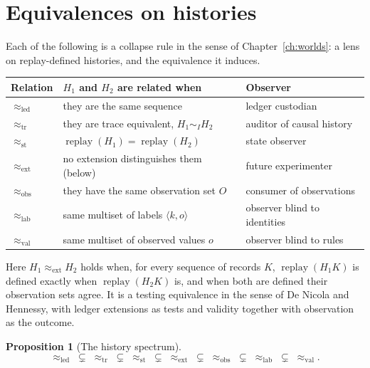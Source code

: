 \documentclass[11pt,openany]{book}
\newtheorem{proposition}[theorem]{Proposition}
\theoremstyle{remark}
\newcommand{\replay}{\operatorname{replay}}
\begin{document}
\section{Equivalences on histories}

Each of the following is a collapse rule in the sense of
Chapter~\ref{ch:worlds}: a lens on replay-defined histories, and the
equivalence it induces.
\begin{center}
\small
\begin{tabular}{lll}
\toprule
Relation & $H_1$ and $H_2$ are related when & Observer\\
\midrule
$\approx_{\mathrm{led}}$ & they are the same sequence & ledger custodian\\
$\approx_{\mathrm{tr}}$ & they are trace equivalent, $H_1\sim_I H_2$ & auditor of causal history\\
$\approx_{\mathrm{st}}$ & $\replay(H_1)=\replay(H_2)$ & state observer\\
$\approx_{\mathrm{ext}}$ & no extension distinguishes them (below) & future experimenter\\
$\approx_{\mathrm{obs}}$ & they have the same observation set $O$ & consumer of observations\\
$\approx_{\mathrm{lab}}$ & same multiset of labels $\langle k,o\rangle$ & observer blind to identities\\
$\approx_{\mathrm{val}}$ & same multiset of observed values $o$ & observer blind to rules\\
\bottomrule
\end{tabular}
\end{center}
Here $H_1\approx_{\mathrm{ext}}H_2$ holds when, for every sequence of
records $K$, $\replay(H_1K)$ is defined exactly when $\replay(H_2K)$ is,
and when both are defined their observation sets agree. It is a testing
equivalence in the sense of De Nicola and Hennessy, with ledger
extensions as tests and validity together with observation as the
outcome.

\begin{proposition}[The history spectrum]\label{prop:hspec}
\[
\approx_{\mathrm{led}}\;\subsetneq\;\approx_{\mathrm{tr}}\;\subsetneq\;
\approx_{\mathrm{st}}\;\subsetneq\;\approx_{\mathrm{ext}}\;\subsetneq\;
\approx_{\mathrm{obs}}\;\subsetneq\;\approx_{\mathrm{lab}}\;\subsetneq\;
\approx_{\mathrm{val}}.
\]
\end{proposition}
\end{document}
